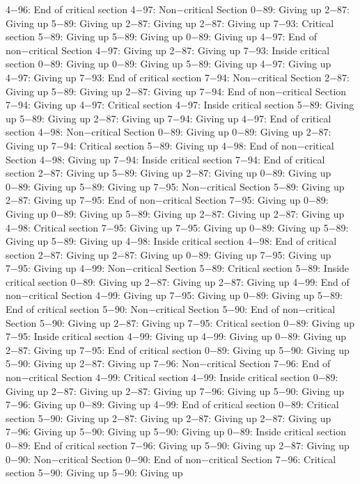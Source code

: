 4−96: End of critical section
4−97: Non−critical Section
0−89: Giving up
2−87: Giving up
5−89: Giving up
2−87: Giving up
2−87: Giving up
7−93: Critical section
5−89: Giving up
5−89: Giving up
0−89: Giving up
4−97: End of non−critical Section
4−97: Giving up
2−87: Giving up
7−93: Inside critical section
0−89: Giving up
0−89: Giving up
5−89: Giving up
4−97: Giving up
4−97: Giving up
7−93: End of critical section
7−94: Non−critical Section
2−87: Giving up
5−89: Giving up
2−87: Giving up
7−94: End of non−critical Section
7−94: Giving up
4−97: Critical section
4−97: Inside critical section
5−89: Giving up
5−89: Giving up
2−87: Giving up
7−94: Giving up
4−97: End of critical section
4−98: Non−critical Section
0−89: Giving up
0−89: Giving up
2−87: Giving up
7−94: Critical section
5−89: Giving up
4−98: End of non−critical Section
4−98: Giving up
7−94: Inside critical section
7−94: End of critical section
2−87: Giving up
5−89: Giving up
2−87: Giving up
0−89: Giving up
0−89: Giving up
5−89: Giving up
7−95: Non−critical Section
5−89: Giving up
2−87: Giving up
7−95: End of non−critical Section
7−95: Giving up
0−89: Giving up
0−89: Giving up
5−89: Giving up
2−87: Giving up
2−87: Giving up
4−98: Critical section
7−95: Giving up
7−95: Giving up
0−89: Giving up
5−89: Giving up
5−89: Giving up
4−98: Inside critical section
4−98: End of critical section
2−87: Giving up
2−87: Giving up
0−89: Giving up
7−95: Giving up
7−95: Giving up
4−99: Non−critical Section
5−89: Critical section
5−89: Inside critical section
0−89: Giving up
2−87: Giving up
2−87: Giving up
4−99: End of non−critical Section
4−99: Giving up
7−95: Giving up
0−89: Giving up
5−89: End of critical section
5−90: Non−critical Section
5−90: End of non−critical Section
5−90: Giving up
2−87: Giving up
7−95: Critical section
0−89: Giving up
7−95: Inside critical section
4−99: Giving up
4−99: Giving up
0−89: Giving up
2−87: Giving up
7−95: End of critical section
0−89: Giving up
5−90: Giving up
5−90: Giving up
2−87: Giving up
7−96: Non−critical Section
7−96: End of non−critical Section
4−99: Critical section
4−99: Inside critical section
0−89: Giving up
2−87: Giving up
2−87: Giving up
7−96: Giving up
5−90: Giving up
7−96: Giving up
0−89: Giving up
4−99: End of critical section
0−89: Critical section
5−90: Giving up
2−87: Giving up
2−87: Giving up
2−87: Giving up
7−96: Giving up
5−90: Giving up
5−90: Giving up
0−89: Inside critical section
0−89: End of critical section
7−96: Giving up
5−90: Giving up
2−87: Giving up
0−90: Non−critical Section
0−90: End of non−critical Section
7−96: Critical section
5−90: Giving up
5−90: Giving up
